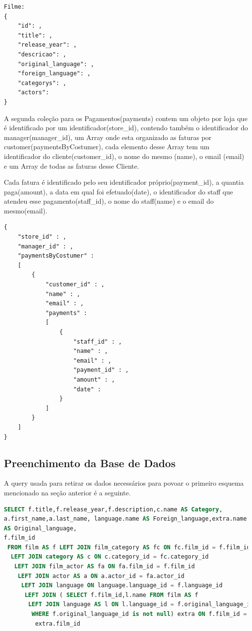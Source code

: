 \begin{lstlisting}[caption=Esquema da coleção films]
Filme:
{
	"id": , 
	"title": , 
	"release_year": , 
	"descricao": , 
	"original_language": , 
	"foreign_language": ,  
	"categorys": ,
	"actors":
}
\end{lstlisting}

A segunda coleção para os Pagamentos(payments) contem um objeto por loja que é identificado por um identificador(store\_id), contendo também o identificador do manager(manager\_id), um Array onde esta organizado as faturas por customer(paymentsByCostumer), cada elemento desse Array tem um identificador do cliente(customer\_id), o nome do mesmo (name), o email (email) e um Array de todas as faturas desse Cliente.

Cada fatura é identificado pelo seu identificador próprio(payment\_id), a quantia paga(amount), a data em qual foi efetuado(date), o identificador do staff que atendeu esse pagamento(staff\_id), o nome do staff(name) e o email do mesmo(email).

\begin{lstlisting}[caption=Esquema da coleção payments]
{
	"store_id" : ,
	"manager_id" : ,
	"paymentsByCostumer" : 
	[
		{
			"customer_id" : ,
			"name" : ,
			"email" : ,
			"payments" : 
			[
				{
					"staff_id" : ,
					"name" : ,
					"email" : ,
					"payment_id" : ,
					"amount" : ,
					"date" : 
				}
			]
		}
	]
}
\end{lstlisting}

\subsection{Preenchimento da Base de Dados}

A query usada para retirar os dados necessários para povoar o primeiro esquema mencionado na seção anterior é a seguinte.

\begin{lstlisting}[language=sql,caption=Query para povoar a primeira coleção]
SELECT f.title,f.release_year,f.description,c.name AS Category,
a.first_name,a.last_name, language.name AS Foreign_language,extra.name 
AS Original_language,
f.film_id 
 FROM film AS f LEFT JOIN film_category AS fc ON fc.film_id = f.film_id 
  LEFT JOIN category AS c ON c.category_id = fc.category_id 
   LEFT JOIN film_actor AS fa ON fa.film_id = f.film_id 
    LEFT JOIN actor AS a ON a.actor_id = fa.actor_id 
     LEFT JOIN language ON language.language_id = f.language_id 
      LEFT JOIN ( SELECT f.film_id,l.name FROM film AS f 
       LEFT JOIN language AS l ON l.language_id = f.original_language_id 
        WHERE f.original_language_id is not null) extra ON f.film_id = 
         extra.film_id
\end{lstlisting}


